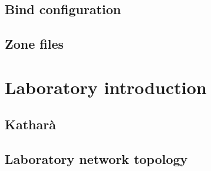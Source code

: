 \documentclass[11pt,a4paper]{article}
\begin{document}
\subsection{Bind configuration}

\subsection{Zone files}

\section{Laboratory introduction}

\subsection{Katharà}

\subsection{Laboratory network topology}
\end{document}

